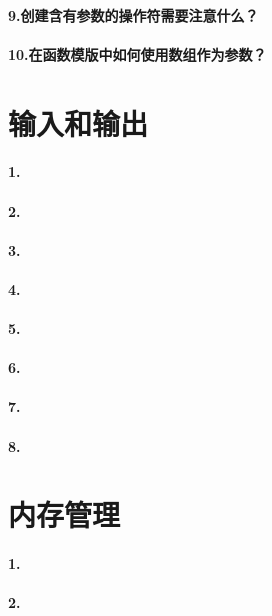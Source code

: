 \documentclass[UTF8,a4paper,8pt]{ctexart}
\begin{document}
  	 \paragraph{9.创建含有参数的操作符需要注意什么？}
  	 \paragraph{10.在函数模版中如何使用数组作为参数？}

\section*{输入和输出}
  	 \paragraph{1.} 
  	 \paragraph{2.}
  	 \paragraph{3.}
  	 \paragraph{4.}
  	 \paragraph{5.}
  	 \paragraph{6.}
  	 \paragraph{7.}
  	 \paragraph{8.}

\section*{内存管理}
  	 \paragraph{1.} 
  	 \paragraph{2.}
\end{document}
